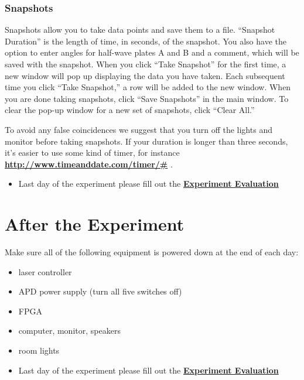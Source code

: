 \documentclass{../lab}
\begin{document}
\subsubsection{Snapshots}

Snapshots allow you to take data points and save them to a file. ``Snapshot Duration'' is the length of time, in seconds, of the snapshot. You also have the option to enter angles for half-wave plates A and B and a comment, which will be saved with the snapshot. When you click ``Take Snapshot'' for the first time, a new window will pop up displaying the data you have taken. Each subsequent time you click ``Take Snapshot,'' a row will be added to the new window. When you are done taking snapshots, click ``Save Snapshots'' in the main window. To clear the pop-up window for a new set of snapshots, click ``Clear All.''

To avoid any false coincidences we suggest that you turn off the lights and monitor before taking snapshots. If your duration is longer than three seconds, it's easier to use some kind of timer, for instance \href{http://www.timeanddate.com/timer/#}{\textbf{http://www.timeanddate.com/timer/\#}} .

\begin{itemize}
    \item Last day of the experiment please fill out the \href{\ExperimentEvaluation}{\textbf{Experiment Evaluation}}

\end{itemize}

\section{After the Experiment}

Make sure all of the following equipment is powered down at the end of each day:

\begin{itemize}
    \item laser controller

    \item APD power supply (turn all five switches off)

    \item FPGA

    \item computer, monitor, speakers

    \item room lights

    \item Last day of the experiment please fill out the \href{\ExperimentEvaluation}{\textbf{Experiment Evaluation}}

\end{itemize}
\end{document}
